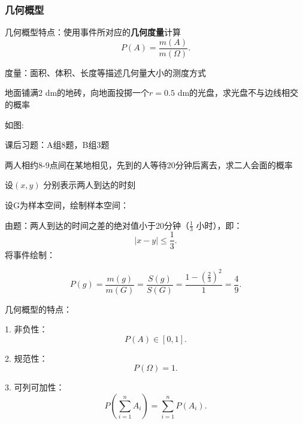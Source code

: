 \subsubsection{几何概型}%
\label{subsub:几何概型}
几何概型特点：使用事件所对应的\textbf{几何度量}计算
\[
    P\left( A \right) =\frac{m\left( A \right) }{m\left( \Omega \right) }
.\] 
\begin{notation}
    度量：面积、体积、长度等描述几何量大小的测度方式
\end{notation}
\begin{eg}
    地面铺满2 dm的地砖，向地面投掷一个$r=0.5$ dm的光盘，求光盘不与边线相交的概率
\end{eg}
如图:
\begin{center}
\end{center}
课后习题：A组8题，B组3题
\begin{eg}
    两人相约8-9点间在某地相见，先到的人等待20分钟后离去，求二人会面的概率

    设$\left( x,y \right) $ 分别表示两人到达的时刻

    设G为样本空间，绘制样本空间：
    \begin{center}
    \end{center}

    由题：两人到达的时间之差的绝对值小于20分钟（$\frac{1}{3}$ 小时），即：\[
        |x-y|\le \frac{1}{3}
    .\] 
    将事件绘制：
    \begin{center}
    \end{center}
    \[
        P\left( g \right) =\frac{m\left( g \right) }{m\left( G \right) }=\frac{S\left( g \right) }{S\left( G \right) }=\frac{1-\left( \frac{2}{3} \right) ^2}{1}=\frac{4}{9}
    .\] 
\end{eg}
\begin{notation}
    几何概型的特点：

    1. 非负性：\[
        P\left( A \right) \in \left[ 0,1 \right] 
    .\] 

    2. 规范性：\[
        P\left( \Omega \right) =1
    .\] 

    3. 可列可加性： \[
        P\left( \sum_{i=1}^{n} A_i \right) =\sum_{i=1}^{n} P\left( A_i \right) 
    .\] 
\end{notation}

